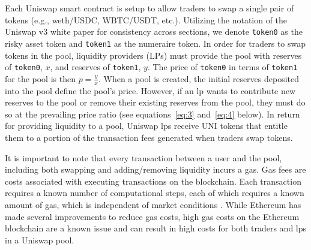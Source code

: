 \documentclass[11pt]{article}
\begin{document}
Each Uniswap smart contract is setup to allow traders to swap a single pair of tokens (e.g., \gls{weth}/USDC, WBTC/USDT, etc.). Utilizing the notation of the Uniswap v3 white paper for consistency across sections, we denote \texttt{token0} as the risky asset token and \texttt{token1} as the numeraire token. In order for traders to swap tokens in the pool, liquidity providers (LPs) must provide the pool with reserves of \texttt{token0}, $x$, and reserves of \texttt{token1}, $y$. The price of \texttt{token0} in terms of \texttt{token1} for the pool is then $p = \frac{y}{x}$. When a pool is created, the initial reserves deposited into the pool define the pool's price. However, if an \gls{lp} wants to contribute new reserves to the pool or remove their existing reserves from the pool, they must do so at the prevailing price ratio (see equations~\eqref{eq:3} and~\eqref{eq:4} below). In return for providing liquidity to a pool, Uniswap \glspl{lp} receive UNI tokens that entitle them to a portion of the transaction fees generated when traders swap tokens.


It is important to note that every transaction between a user and the pool, including both swapping and adding/removing liquidity incurs a \gls{gas}. Gas fees are costs associated with executing transactions on the \gls{blockchain}. Each transaction requires a known number of computational steps, each of which requires a known amount of gas, which is independent of market conditions \citep{Lehar2021DecentralizedE}. While Ethereum has made several improvements to reduce gas costs, high gas costs on the Ethereum blockchain are a known issue and can result in high costs for both traders and \glspl{lp} in a Uniswap pool.
\end{document}
